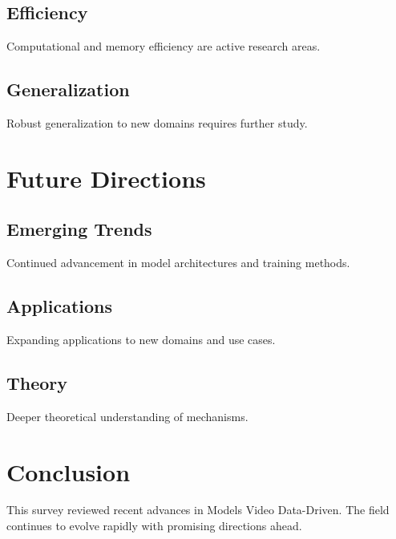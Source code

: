 \documentclass[11pt,a4paper]{article}
\begin{document}
\subsection{Efficiency}

Computational and memory efficiency are active research areas.

\subsection{Generalization}

Robust generalization to new domains requires further study.



\section{Future Directions}

\subsection{Emerging Trends}

Continued advancement in model architectures and training methods.

\subsection{Applications}

Expanding applications to new domains and use cases.

\subsection{Theory}

Deeper theoretical understanding of mechanisms.



\section{Conclusion}

This survey reviewed recent advances in Models Video Data-Driven. The field continues to evolve rapidly with promising directions ahead.
\end{document}
